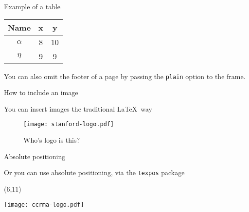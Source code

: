 \documentclass{beamer}
\begin{document}
\begin{frame}[plain]{Example of a table}

    \vspace{2cm}

    \begin{center}
        \begin{tabular}{c c c}
        \bf Name & \bf x & \bf y \\
        \hline
        $\alpha$ & 8 & 10 \\
        $\eta$ & 9 & 9 \\
        \hline
        \end{tabular}
    \end{center}

    \vspace{2cm}

    \begin{center}
    \scriptsize
    \hfill You can also omit the footer of a page by passing the \texttt{plain}
    option to the frame.
    \end{center}

\end{frame}

\begin{frame}{How to include an image}

    You can insert images the traditional \LaTeX~way

    \begin{figure}
        \texttt{[image: stanford-logo.pdf]}
        \caption{Who's logo is this?}
    \end{figure}
\end{frame}


\begin{frame}{Absolute positioning}

    Or you can use absolute positioning, via the \texttt{texpos} package



    \begin{textblock}{20}(6,11)
    \begin{rotate}{33}
      \texttt{[image: ccrma-logo.pdf]}
    \end{rotate}
    \end{textblock}


\end{frame}
\end{document}
